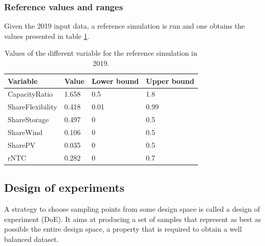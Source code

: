 \subsubsection{Reference values and ranges}

Given the 2019 input data, a reference simulation is run and one obtains the values presented in table \ref{table:reference-values}.

\begin{table}[h]
    \centering
    \begin{tabular}{|l l l l|}
        \hline
        Variable         & Value  & Lower bound & Upper bound \\ \hline
        CapacityRatio    & 1.658  & 0.5         & 1.8         \\
        ShareFlexibility & 0.418  & 0.01        & 0.99        \\
        ShareStorage     & 0.497  & 0           & 0.5         \\
        ShareWind        & 0.106  & 0           & 0.5         \\
        SharePV          & 0.035  & 0           & 0.5         \\
        rNTC             & 0.282  & 0           & 0.7         \\ \hline
    \end{tabular}
    \caption{Values of the different variable for the reference simulation in 2019.}
    \label{table:reference-values}
\end{table}

\subsection{Design of experiments}

A strategy to choose sampling points from some design space is called a design of experiment (DoE). It aims at producing a set of samples that represent as best as possible the entire design space, a property that is required to obtain a well balanced dataset. 

